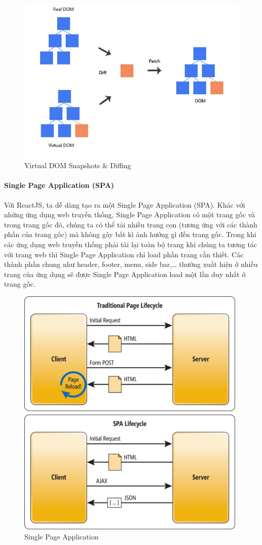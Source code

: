 \begin{figure}[H]
\centering
\includegraphics[width=12cm]{images/virtualdom.jpg}
\caption{Virtual DOM Snapshots \& Diffing}
\label{fig:virtualdom}
\end{figure}

\paragraph{Single Page Application (SPA)}
Với ReactJS, ta dễ dàng tạo ra một Single Page Application (SPA).
Khác với những ứng dụng web truyền thống, Single Page Application
có một trang gốc và trong trang gốc đó, chúng ta có thể tải
nhiều trang con (tương ứng với các thành phần của trang gốc) mà
không gây bất kì ảnh hưởng gì đến trang gốc. Trong khi các
ứng dụng web truyền thống phải tải lại toàn bộ trang khi
chúng ta tương tác với trang web thì Single Page Application chỉ load
phần trang cần thiết. Các thành phần chung như header, footer, menu,
side bar,… thường xuất hiện ở nhiều trang của ứng dụng sẽ được
Single Page Application load một lần duy nhất ở trang gốc.

\begin{figure}[H]
\centering
\includegraphics[width=11cm]{images/spa.png}
\caption{Single Page Application }
\label{fig:spa}
\end{figure}

